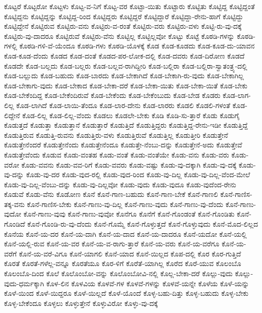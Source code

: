 {ಕೊಟ್ಟರೆ
ಕೊಟ್ಟರೋ
ಕೊಟ್ಟಳು
ಕೊಟ್ಟ-ವ-ನಿಗೆ
ಕೊಟ್ಟ-ವರ
ಕೊಟ್ಟಾ-ಯಿತು
ಕೊಟ್ಟಾರು
ಕೊಟ್ಟಿತು
ಕೊಟ್ಟಿದ್ದ
ಕೊಟ್ಟಿದ್ದಂತೆ
ಕೊಟ್ಟಿದ್ದನು
ಕೊಟ್ಟಿದ್ದನ್ನು
ಕೊಟ್ಟಿದ್ದ-ರಿಂದ
ಕೊಟ್ಟಿದ್ದರು
ಕೊಟ್ಟಿದ್ದರೆ
ಕೊಟ್ಟಿದ್ದಾರೆ
ಕೊಟ್ಟಿದ್ದಾ-ರೇನು-ಹಾಗೆ
ಕೊಟ್ಟಿದ್ದು
ಕೊಟ್ಟಿದ್ದೇನೆ
ಕೊಟ್ಟಿರುವ
ಕೊಟ್ಟಿರು-ವನು
ಕೊಟ್ಟಿರು-ವ-ರಂತೆ
ಕೊಟ್ಟಿರು-ವರು
ಕೊಟ್ಟಿರು-ವಳು
ಕೊಟ್ಟಿ-ರು-ವು-ದಕ್ಕೆ
ಕೊಟ್ಟಿರು-ವು-ದಾದರೂ
ಕೊಟ್ಟಿರುವೆ
ಕೊಟ್ಟಿರು-ವೆನು
ಕೊಟ್ಟಿಲ್ಲ
ಕೊಟ್ಟಿಲ್ಲವೋ
ಕೊಟ್ಟು
ಕೊಟ್ಟೆ
ಕೊಠಡಿ-ಗಳನ್ನು
ಕೊಠಡಿ-ಗಳಲ್ಲಿ
ಕೊಠಡಿ-ಗಳಿ-ವೆ-ಯೆಂದೂ
ಕೊಠಡಿ-ಗಳು
ಕೊಠಡಿ-ಯೊಳಕ್ಕೆ
ಕೊಡ
ಕೊಡ-ಕೂಡದು
ಕೊಡ-ಕೂಡ-ದು-ಯಾವನ
ಕೊಡ-ಕೂಡ-ದೆಂದು
ಕೊಡದ
ಕೊಡ-ದಂತೆ
ಕೊಡದ-ಪರ-ಲೋಕ-ದಲ್ಲಿ
ಕೊಡ-ದವರು
ಕೊಡ-ದಿರೋಣ
ಕೊಡದೆ
ಕೊಡದೇ
ಕೊಡ-ಬಲ್ಲದು
ಕೊಡ-ಬಲ್ಲರು
ಕೊಡ-ಬಲ್ಲವ-ರಾಗಿದ್ದೀರಿ
ಕೊಡ-ಬಲ್ಲಿರಾ
ಕೊಡ-ಬಲ್ಲಿರಾ-ಸ್ವಾತಂತ್ರ್ಯ-ದಲ್ಲಿ
ಕೊಡ-ಬಲ್ಲುದು
ಕೊಡ-ಬಹುದು
ಕೊಡ-ಬಾರದು
ಕೊಡ-ಬೇಕಾಗಿದೆ
ಕೊಡ-ಬೇಕಾಗಿ-ರು-ವುದು
ಕೊಡ-ಬೇಕಾಗಿಲ್ಲ
ಕೊಡ-ಬೇಕಾಗು-ವುದು
ಕೊಡ-ಬೇಕಾದ
ಕೊಡ-ಬೇಕಾ-ದರೆ
ಕೊಡ-ಬೇಕಾ-ಯಿತು
ಕೊಡ-ಬೇಕಾ-ಯಿತೆ
ಕೊಡ-ಬೇಕು
ಕೊಡ-ಬೇಕೆಂದಿದ್ದ
ಕೊಡ-ಬೇಕೆಂದಿರುವೆ
ಕೊಡ-ಬೇಕೆಂದು
ಕೊಡ-ಬೇಕೆಂಬುದು
ಕೊಡ-ಬೇಡ
ಕೊಡರು
ಕೊಡ-ಲಾಗ-ಲಿಲ್ಲ
ಕೊಡ-ಲಾಗಿದೆ
ಕೊಡ-ಲಾಯಿ-ತೆಂದೂ
ಕೊಡ-ಲಾರ-ದೇನು
ಕೊಡ-ಲಾರರು
ಕೊಡಲಿ
ಕೊಡಲಿ-ಗಳಂತೆ
ಕೊಡ-ಲಿದ್ದೇನೆ
ಕೊಡ-ಲಿಲ್ಲ
ಕೊಡ-ಲಿಲ್ಲ-ವೆಂದು
ಕೊಡಲು
ಕೊಡಲೇ-ಬೇಕು
ಕೊಡಿ
ಕೊಡಿ-ಸು-ತ್ತಾರೆ
ಕೊಡು
ಕೊಡುಗೈ
ಕೊಡುತ್ತದೆ
ಕೊಡುತ್ತಾ
ಕೊಡುತ್ತಾನೆ
ಕೊಡುತ್ತಾರೆ
ಕೊಡುತ್ತಿದೆ
ಕೊಡುತ್ತಿದ್ದರು
ಕೊಡುತ್ತಿದ್ದ-ರೇನು-ಇಡೀ
ಕೊಡುತ್ತಿದ್ದೆ
ಕೊಡುತ್ತಿರುವ
ಕೊಡುತ್ತಿ-ರುವನು
ಕೊಡುತ್ತಿರು-ವಳು
ಕೊಡುತ್ತಿರುವೆ
ಕೊಡುತ್ತಿಲ್ಲ
ಕೊಡುತ್ತೀರಿ
ಕೊಡುತ್ತೇನೆ
ಕೊಡುತ್ತೇನೆಂದರೆ
ಕೊಡುತ್ತೇನೆಂದು
ಕೊಡುತ್ತೇನೆಂದೂ
ಕೊಡುತ್ತೇ-ನೆಂಬು-ದನ್ನು
ಕೊಡುತ್ತೇನೆ-ಅದು
ಕೊಡುತ್ತೇವೆ
ಕೊಡುತ್ತೇವೆಂದು
ಕೊಡುವ
ಕೊಡು-ವಂತಹ
ಕೊಡು-ವಂತೆ
ಕೊಡು-ವಂತೆಯೇ
ಕೊಡು-ವನು
ಕೊಡು-ವರು
ಕೊಡು-ವರೋ
ಕೊಡು-ವವನು
ಕೊಡು-ವವ-ರಿಗೆ
ಕೊಡು-ವವರು
ಕೊಡು-ವಷ್ಟು
ಕೊಡು-ವು-ದಕ್ಕಾಗಿ
ಕೊಡು-ವು-ದಕ್ಕೆ
ಕೊಡು-ವು-ದನ್ನು
ಕೊಡು-ವು-ದರ
ಕೊಡು-ವುದ-ರಲ್ಲಿ
ಕೊಡು-ವುದ-ರಿಂದ
ಕೊಡು-ವು-ದಿಲ್ಲ
ಕೊಡು-ವು-ದಿಲ್ಲ-ವೆಂದ-ಮೇಲೆ
ಕೊಡು-ವು-ದಿಲ್ಲ-ವೆಂಬು-ದನ್ನು
ಕೊಡು-ವು-ದಿಲ್ಲವೋ
ಕೊಡು-ವುದು
ಕೊಡು-ವುದೂ
ಕೊಡು-ವುದೆಂದ-ರೇನು
ಕೊಡುವೆ
ಕೊಡು-ವೆನು
ಕೊಡೋಣ
ಕೊನೆ
ಕೊನೆ-ಗಾಣ-ಬಹುದು
ಕೊನೆ-ಗಾಣ-ಬೇಕೆ
ಕೊನೆ-ಗಾಣಲಿ
ಕೊನೆ-ಗಾಣಿಸ-ತಕ್ಕ-ವನು
ಕೊನೆ-ಗಾಣಿಸ-ಬೇಕು
ಕೊನೆ-ಗಾಣು-ವು-ದಿಲ್ಲ
ಕೊನೆ-ಗಾಣು-ವುದು
ಕೊನೆ-ಗಾಣು-ವು-ದೆಂದು
ಕೊನೆ-ಗಾಣು-ವುದೋ
ಕೊನೆ-ಗಾಣು-ವುವು
ಕೊನೆ-ಗಾಣು-ವುವೋ
ಕೊನೆಗೂ
ಕೊನೆಗೆ
ಕೊನೆ-ಗೊಂಡಂತೆ
ಕೊನೆ-ಗೊಂಡಿತು
ಕೊನೆ-ಗೊಂಡಿದೆ
ಕೊನೆ-ಗೊಂಡಿ-ರು-ವು-ದೆಂದು
ಕೊನೆ-ಗೊಮ್ಮೆ
ಕೊನೆ-ಗೊಳ್ಳುತ್ತದೆ
ಕೊನೆ-ಗೊಳ್ಳುವುದು
ಕೊನೆ-ಮೊದ-ಲಿಲ್ಲದ
ಕೊನೆಯ
ಕೊನೆ-ಯ-ದರ
ಕೊನೆ-ಯ-ದಾಗಿ
ಕೊನೆ-ಯ-ದಾದ
ಕೊನೆ-ಯ-ದಾದರೂ
ಕೊನೆ-ಯದೋ
ಕೊನೆ-ಯಲ್ಲಿ
ಕೊನೆ-ಯಲ್ಲಿ-ರುವ
ಕೊನೆ-ಯ-ವರ
ಕೊನೆ-ಯ-ವ-ರಾಗು-ತ್ತಾರೆ
ಕೊನೆ-ಯ-ವರು
ಕೊನೆ-ಯ-ವರೆಗೂ
ಕೊನೆ-ಯ-ವರೆಗೆ
ಕೊನೆ-ಯ-ವರೆ-ವಿಗೂ
ಕೊನೆ-ಯಾಗಲಿ
ಕೊನೆ-ಯಾದ
ಕೊನೆ-ಯಿಲ್ಲದ
ಕೊಪ-ದಲ್ಲಿ
ಕೊರ
ಕೊರ-ಗುತ್ತಿದೆ
ಕೊರತೆ
ಕೊರತೆ-ಗಳೆಲ್ಲ-ವನ್ನೂ
ಕೊರತೆಯೂ
ಕೊರ-ಳಿಗೆ
ಕೊರೆತೆ-ಯಾಗಿಲ್ಲ
ಕೊರೆದ
ಕೊರೆ-ಯುವ
ಕೊಲಂಬೊ
ಕೊಲಂಬೊ-ದಿಂದ
ಕೊಲೆ
ಕೊಲೊಂಬೋ-ವನ್ನು
ಕೊಲೊಂಬೋವಿ-ನಲ್ಲಿ
ಕೊಲ್ಲ-ಬೇಕಾ-ದರೆ
ಕೊಲ್ಲು-ವುದು
ಕೊಲ್ಲು-ವುದು-ಧರ್ಮಕ್ಕಾಗಿ
ಕೊಳ-ಲಿನ
ಕೊಳವಿಯ
ಕೊಳವೆ-ಗಳ
ಕೊಳವೆ-ಗಳನ್ನು
ಕೊಳವೆ-ಯನ್ನೇ
ಕೊಳೆಯ
ಕೊಳೆ-ಯನ್ನು
ಕೊಳೆ-ಯಿಂದ
ಕೊಳೆ-ಯಿದ್ದರೂ
ಕೊಳೆ-ಯಿಲ್ಲದೆ
ಕೊಳೆ-ಯೊಂದೆ
ಕೊಳ್ಳ-ಬಹು-ದಿತ್ತು
ಕೊಳ್ಳ-ಬಹುದು
ಕೊಳ್ಳ-ಬೇಕು
ಕೊಳ್ಳ-ಬೇಕೆಂದೂ
ಕೊಳ್ಳಲು
ಕೊಳ್ಳುತ್ತೇನೆ
ಕೊಳ್ಳುವಿರೋ
ಕೊಳ್ಳು-ವು-ದಕ್ಕೆ
}
